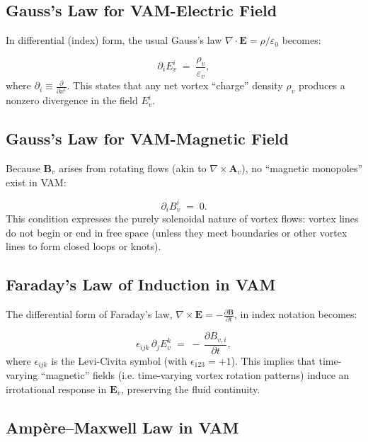 \documentclass[aps,preprint,superscriptaddress]{revtex4-2}
\begin{document}
    \subsection{Gauss’s Law for VAM-Electric Field}

    In differential (index) form, the usual Gauss’s law \(\nabla\cdot\mathbf{E} = \rho/\varepsilon_0\) becomes:

    \[
        \partial_i E_{v}^i
        \;=\;
        \frac{\rho_v}{\varepsilon_v},
        \tag{1}
    \]
    where \(\partial_i \equiv \frac{\partial}{\partial x^i}\). This states that any net vortex “charge” density \(\rho_v\) produces a nonzero divergence in the field \(E_{v}^i\).

    \subsection{Gauss’s Law for VAM-Magnetic Field}

    Because \(\mathbf{B}_v\) arises from rotating flows (akin to \(\nabla\times \mathbf{A}_v\)), no “magnetic monopoles” exist in VAM:

    \[
        \partial_i B_{v}^i
        \;=\; 0.
        \tag{2}
    \]
    This condition expresses the purely solenoidal nature of vortex flows: vortex lines do not begin or end in free space (unless they meet boundaries or other vortex lines to form closed loops or knots).

    \subsection{Faraday’s Law of Induction in VAM}

    The differential form of Faraday’s law, \(\nabla\times \mathbf{E} = -\frac{\partial \mathbf{B}}{\partial t}\), in index notation becomes:

    \[
        \epsilon_{ijk}\,\partial_j E_{v}^k
        \;=\;
        -\,\frac{\partial B_{v,i}}{\partial t},
        \tag{3}
    \]
    where \(\epsilon_{ijk}\) is the Levi-Civita symbol (with \(\epsilon_{123} = +1\)). This implies that time-varying “magnetic” fields (i.e. time-varying vortex rotation patterns) induce an irrotational response in \(\mathbf{E}_v\), preserving the fluid continuity.

    \subsection{Ampère--Maxwell Law in VAM}
\end{document}
